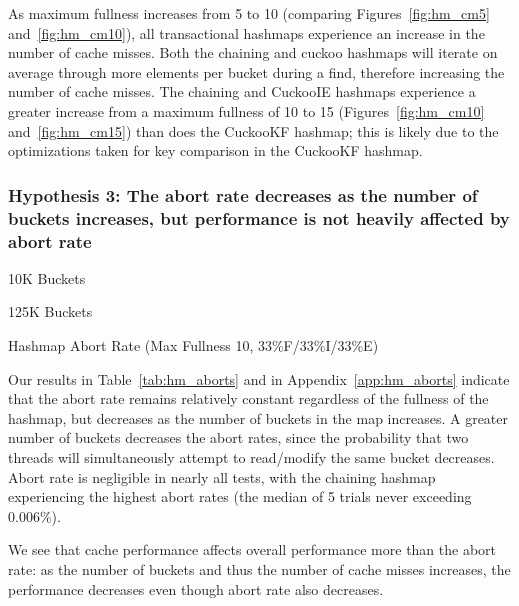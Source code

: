 As maximum fullness increases from 5 to 10 (comparing Figures~\ref{fig:hm_cm5} and~\ref{fig:hm_cm10}), all transactional hashmaps experience an increase in the number of cache misses. Both the chaining and cuckoo hashmaps will iterate on average through more elements per bucket during a find, therefore increasing the number of cache misses. The chaining and CuckooIE hashmaps experience a greater increase from a maximum fullness of 10 to 15 (Figures~\ref{fig:hm_cm10} and~\ref{fig:hm_cm15}) than does the CuckooKF hashmap; this is likely due to the optimizations taken for key comparison in the CuckooKF hashmap.

\subsubsection{Hypothesis 3: The abort rate decreases as the number of buckets increases, but performance is not heavily affected by abort rate}

    \begin{table}[t]
    \centering
	\singlespace
        \begin{minipage}{0.45\textwidth}
        \centering
        
        \caption*{10K Buckets}
        \end{minipage}
        \begin{minipage}{0.45\textwidth}
        \centering
        
        \caption*{125K Buckets}
        \end{minipage}
        \caption{Hashmap Abort Rate (Max Fullness 10, 33\%F/33\%I/33\%E)}
		\label{tab:hm_aborts}
    \end{table}

Our results in Table~\ref{tab:hm_aborts} and in Appendix~\ref{app:hm_aborts} indicate that the abort rate remains relatively constant regardless of the fullness of the hashmap, but decreases as the number of buckets in the map increases. A greater number of buckets decreases the abort rates, since the probability that two threads will simultaneously attempt to read/modify the same bucket decreases. Abort rate is negligible in nearly all tests, with the chaining hashmap experiencing the highest abort rates (the median of 5 trials never exceeding 0.006\%).

We see that cache performance affects overall performance more than the abort rate: as the number of buckets and thus the number of cache misses increases, the performance decreases even though abort rate also decreases.

